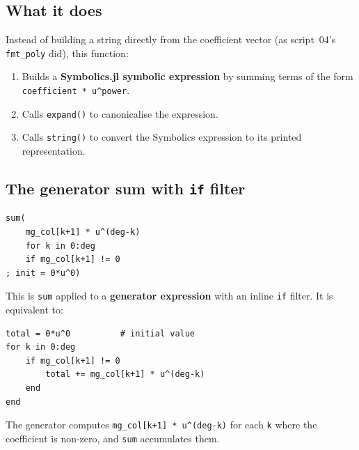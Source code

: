 \documentclass[12pt, a4paper]{article}
\newcommand{\cd}[1]{\texttt{#1}}
\begin{document}
\subsection{What it does}

Instead of building a string directly from the coefficient
vector (as script~04's \cd{fmt\_poly} did), this function:
\begin{enumerate}
  \item Builds a \textbf{Symbolics.jl symbolic expression}
        by summing terms of the form
        \cd{coefficient * u\^{}power}.
  \item Calls \cd{expand()} to canonicalise the expression.
  \item Calls \cd{string()} to convert the Symbolics
        expression to its printed representation.
\end{enumerate}

\subsection{The generator sum with \texttt{if} filter}

\begin{verbatim}
sum(
    mg_col[k+1] * u^(deg-k)
    for k in 0:deg
    if mg_col[k+1] != 0
; init = 0*u^0)
\end{verbatim}

This is \cd{sum} applied to a \textbf{generator expression}
with an inline \cd{if} filter.
It is equivalent to:

\begin{verbatim}
total = 0*u^0          # initial value
for k in 0:deg
    if mg_col[k+1] != 0
        total += mg_col[k+1] * u^(deg-k)
    end
end
\end{verbatim}

The generator computes \cd{mg\_col[k+1] * u\^{}(deg-k)}
for each \cd{k} where the coefficient is non-zero,
and \cd{sum} accumulates them.
\end{document}
